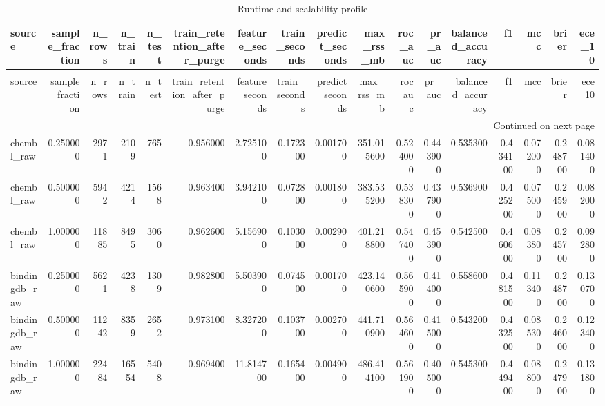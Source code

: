 \begin{longtable}{lrrrrrrrrrrrrrrrr}
\caption{Runtime and scalability profile} \label{tab:table_12_runtime_scalability} \\
\toprule
source & sample\_fraction & n\_rows & n\_train & n\_test & train\_retention\_after\_purge & feature\_seconds & train\_seconds & predict\_seconds & max\_rss\_mb & roc\_auc & pr\_auc & balanced\_accuracy & f1 & mcc & brier & ece\_10 \\
\midrule
\endfirsthead
\caption[]{Runtime and scalability profile} \\
\toprule
source & sample\_fraction & n\_rows & n\_train & n\_test & train\_retention\_after\_purge & feature\_seconds & train\_seconds & predict\_seconds & max\_rss\_mb & roc\_auc & pr\_auc & balanced\_accuracy & f1 & mcc & brier & ece\_10 \\
\midrule
\endhead
\midrule
\multicolumn{17}{r}{Continued on next page} \\
\midrule
\endfoot
\bottomrule
\endlastfoot
chembl\_raw & 0.250000 & 2971 & 2109 & 765 & 0.956000 & 2.725100 & 0.172300 & 0.001700 & 351.015600 & 0.524000 & 0.443900 & 0.535300 & 0.434100 & 0.072000 & 0.248700 & 0.081400 \\
chembl\_raw & 0.500000 & 5942 & 4214 & 1568 & 0.963400 & 3.942100 & 0.072800 & 0.001800 & 383.535200 & 0.538300 & 0.437900 & 0.536900 & 0.425200 & 0.075000 & 0.245900 & 0.082000 \\
chembl\_raw & 1.000000 & 11885 & 8495 & 3060 & 0.962600 & 5.156900 & 0.103000 & 0.002900 & 401.218800 & 0.547400 & 0.453900 & 0.542500 & 0.460600 & 0.083800 & 0.245700 & 0.092800 \\
bindingdb\_raw & 0.250000 & 5621 & 4238 & 1309 & 0.982800 & 5.503900 & 0.074500 & 0.001700 & 423.140600 & 0.565900 & 0.414000 & 0.558600 & 0.481500 & 0.113400 & 0.248700 & 0.130700 \\
bindingdb\_raw & 0.500000 & 11242 & 8359 & 2652 & 0.973100 & 8.327200 & 0.103700 & 0.002700 & 441.710900 & 0.564600 & 0.415000 & 0.543200 & 0.432500 & 0.085300 & 0.246000 & 0.123400 \\
bindingdb\_raw & 1.000000 & 22484 & 16554 & 5408 & 0.969400 & 11.814700 & 0.165400 & 0.004900 & 486.414100 & 0.561900 & 0.405000 & 0.545300 & 0.449400 & 0.088000 & 0.247900 & 0.131800 \\
\end{longtable}
